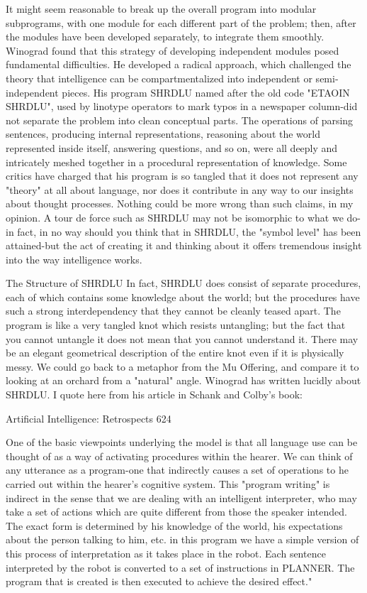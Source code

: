{        It might seem reasonable to break up the overall program into modular
subprograms, with one module for each different part of the problem; then, after the
modules have been developed separately, to integrate them smoothly. Winograd found
that this strategy of developing independent modules posed fundamental difficulties. He
developed a radical approach, which challenged the theory that intelligence can be
compartmentalized into independent or semi-independent pieces. His program SHRDLU
named after the old code "ETAOIN SHRDLU", used by linotype operators to mark
typos in a newspaper column-did not separate the problem into clean conceptual parts.
The operations of parsing sentences, producing internal representations, reasoning about
the world represented inside itself, answering questions, and so on, were all deeply and
intricately meshed together in a procedural representation of knowledge. Some critics
have charged that his program is so tangled that it does not represent any "theory" at all
about language, nor does it contribute in any way to our insights about thought processes.
Nothing could be more wrong than such claims, in my opinion. A tour de force such as
SHRDLU may not be isomorphic to what we do-in fact, in no way should you think that
in SHRDLU, the "symbol level" has been attained-but the act of creating it and thinking
about it offers tremendous insight into the way intelligence works.

                             The Structure of SHRDLU
In fact, SHRDLU does consist of separate procedures, each of which contains some
knowledge about the world; but the procedures have such a strong interdependency that
they cannot be cleanly teased apart. The program is like a very tangled knot which resists
untangling; but the fact that you cannot untangle it does not mean that you cannot
understand it. There may be an elegant geometrical description of the entire knot even if
it is physically messy. We could go back to a metaphor from the Mu Offering, and
compare it to looking at an orchard from a "natural" angle.
        Winograd has written lucidly about SHRDLU. I quote here from his article in
Schank and Colby's book:




Artificial Intelligence: Retrospects                                                  624

   One of the basic viewpoints underlying the model is that all language use can be
   thought of as a way of activating procedures within the hearer. We can think of
   any utterance as a program-one that indirectly causes a set of operations to he
   carried out within the hearer's cognitive system. This "program writing" is indirect
   in the sense that we are dealing with an intelligent interpreter, who may take a set
   of actions which are quite different from those the speaker intended. The exact
   form is determined by his knowledge of the world, his expectations about the
   person talking to him, etc. in this program we have a simple version of this
   process of interpretation as it takes place in the robot. Each sentence interpreted by
   the robot is converted to a set of instructions in PLANNER. The program that is
   created is then executed to achieve the desired effect."


}
